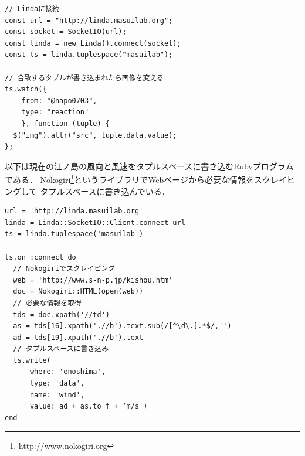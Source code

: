 \vspace{2mm}
\begin{lstlisting}
// Lindaに接続
const url = "http://linda.masuilab.org";
const socket = SocketIO(url);
const linda = new Linda().connect(socket);
const ts = linda.tuplespace("masuilab");

// 合致するタプルが書き込まれたら画像を変える
ts.watch({
    from: "@napo0703",
    type: "reaction"
    }, function (tuple) {
  $("img").attr("src", tuple.data.value);
};
\end{lstlisting}
\vspace{4mm}

以下は現在の江ノ島の風向と風速をタプルスペースに書き込むRubyプログラムである．
Nokogiri\footnote{http://www.nokogiri.org}というライブラリでWebページから必要な情報をスクレイピングして
タプルスペースに書き込んでいる．

\vspace{2mm}
\begin{lstlisting}
url = 'http://linda.masuilab.org'
linda = Linda::SocketIO::Client.connect url
ts = linda.tuplespace('masuilab')

ts.on :connect do
  // Nokogiriでスクレイピング
  web = 'http://www.s-n-p.jp/kishou.htm'
  doc = Nokogiri::HTML(open(web))
  // 必要な情報を取得
  tds = doc.xpath('//td')
  as = tds[16].xpath('.//b').text.sub(/[^\d\.].*$/,'')
  ad = tds[19].xpath('.//b').text
  // タプルスペースに書き込み
  ts.write(
      where: 'enoshima',
      type: 'data',
      name: 'wind',
      value: ad + as.to_f + ‘m/s')
end
\end{lstlisting}